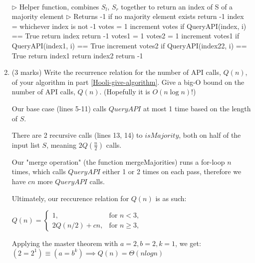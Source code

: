 \documentclass[11pt]{article}
\begin{document}
\begin{enumerate}
\begin{soln}
\begin{algorithmic}[1]
\EndIf
\EndFunction
\\
\State $\triangleright$ Helper function, combines $S_l$, $S_r$ together to return an index of S of a majority element
\State $\triangleright$ Returns -1 if no majority element exists
 
    \State return -1
 
    \State index = whichever index is not -1
    \State votes = 1
        \State increment votes if QueryAPI(index, i) == True
    \EndFor
    \State return index
    \Else
    \State return -1
    \EndIf
\Else
    \State votes1 = 1
    \State votes2 = 1
        \State increment votes1 if QueryAPI(index1, i) == True
        \State increment votes2 if QueryAPI(index22, i) == True
    \EndFor
    \State return index1
    \State return index2
    \Else
    \State return -1
\EndIf
\EndFunction
\end{algorithmic}

\end{soln}

\newpage

\item
(3 marks)
  Write the recurrence relation for the number of API calls, $Q(n)$, of your algorithm in part \ref{Hooli-give-algorithm}. Give a big-O bound on the number of API calls, $Q(n)$. (Hopefully it is $O(n\log n)$!)

\begin{soln}
Our base case (lines 5-11) calls $QueryAPI$ at most 1 time based on the length of $S$.

There are 2 recursive calls (lines 13, 14) to $isMajority$, both on half of the input list $S$, meaning $2Q(\frac{n}{2})$ calls.

Our "merge operation" (the function mergeMajorities) runs a for-loop $n$ times, which calls $QueryAPI$ either 1 or 2 times on each pass, therefore we have $cn$ more $QueryAPI$ calls.

Ultimately, our reccurence relation for $Q(n)$ is as such:

  $Q(n) = \left\{
  \begin{array}{ll}
    1, & \mbox{for $n < 3$}, \\
    2Q(n/2) + cn, & \mbox{for $n \ge 3$},
  \end{array} \right.$

Applying the master theorem with $a=2, b=2, k=1$, we get: \\
    $(2=2^1) \equiv (a=b^k) \implies Q(n) = \Theta(nlogn)$

\end{soln}

\end{enumerate}
\end{document}
